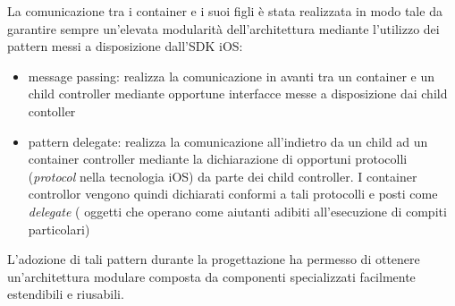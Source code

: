 La comunicazione tra i container e i suoi figli è stata realizzata in modo tale da garantire sempre un'elevata modularità dell'architettura mediante l'utilizzo dei pattern messi a disposizione dall'SDK iOS:

\begin{itemize}
 \item message passing: realizza la comunicazione in avanti tra un container e un child controller mediante opportune interfacce messe a disposizione dai child contoller
 \item pattern delegate: realizza la comunicazione all'indietro da un child ad un container controller mediante la dichiarazione di opportuni protocolli (\emph{protocol} nella tecnologia iOS) da parte dei child controller. I container controllor vengono quindi dichiarati conformi a tali protocolli e posti come \emph{delegate} ( oggetti che operano come aiutanti adibiti all'esecuzione di compiti particolari)
\end{itemize}

L'adozione di tali pattern durante la progettazione ha permesso di ottenere un'architettura modulare composta da componenti specializzati facilmente estendibili e riusabili.

